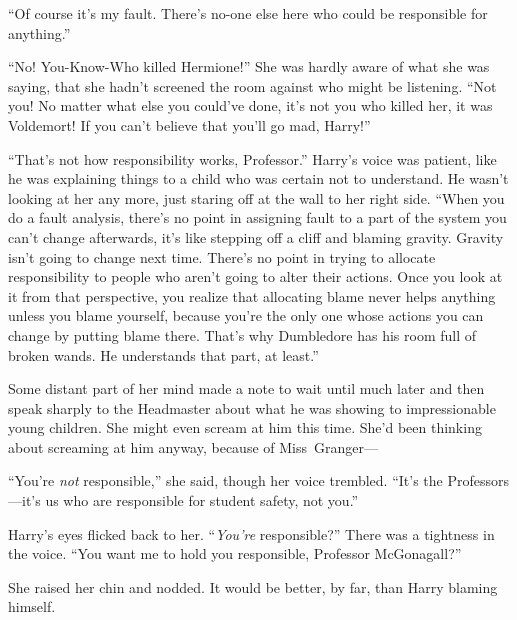 “Of course it’s my fault. There’s no-one else here who could be responsible for anything.”

“No! You-Know-Who killed Hermione!” She was hardly aware of what she was saying, that she hadn’t screened the room against who might be listening. “Not you! No matter what else you could’ve done, it’s not you who killed her, it was Voldemort! If you can’t believe that you’ll go mad, Harry!”

“That’s not how responsibility works, Professor.” Harry’s voice was patient, like he was explaining things to a child who was certain not to understand. He wasn’t looking at her any more, just staring off at the wall to her right side. “When you do a fault analysis, there’s no point in assigning fault to a part of the system you can’t change afterwards, it’s like stepping off a cliff and blaming gravity. Gravity isn’t going to change next time. There’s no point in trying to allocate responsibility to people who aren’t going to alter their actions. Once you look at it from that perspective, you realize that allocating blame never helps anything unless you blame yourself, because you’re the only one whose actions you can change by putting blame there. That’s why Dumbledore has his room full of broken wands. He understands that part, at least.”

Some distant part of her mind made a note to wait until much later and then speak sharply to the Headmaster about what he was showing to impressionable young children. She might even scream at him this time. She’d been thinking about screaming at him anyway, because of Miss~Granger—

“You’re \emph{not} responsible,” she said, though her voice trembled. “It’s the Professors—it’s us who are responsible for student safety, not you.”

Harry’s eyes flicked back to her. “\emph{You’re} responsible?” There was a tightness in the voice. “You want me to hold you responsible, Professor McGonagall?”

She raised her chin and nodded. It would be better, by far, than Harry blaming himself.

